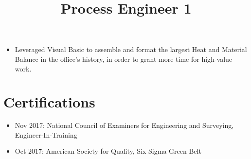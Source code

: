 \documentclass[12pt]{res} %
\begin{document}
\begin{resume}
        \title{\textbf{Process Engineer 1}}
        \begin{position}
          \vspace{-14pt}
          \begin{itemize}[leftmargin=-0.4cm]
              \itemsep0em
              \item Leveraged Visual Basic to assemble and format the largest Heat and Material Balance in the office's history, in order to grant more time for high-value work.
          \end{itemize}
        \end{position}
        \vspace{-12pt}

      \section{Certifications} 
        \begin{itemize}[leftmargin=-0.4cm]
        \itemsep0em
        \item Nov 2017: National Council of Examiners for Engineering and Surveying, Engineer-In-Training
        \item Oct 2017: American Society for Quality, Six Sigma Green Belt
        \end{itemize}
        \vspace{-12pt}

    \end{resume}

\vspace*{\fill}
\end{document}

